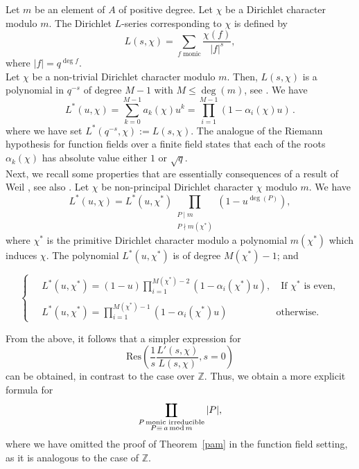 \documentclass[12pt]{amsart}
\DeclareMathOperator*\Rprod{%
\mathchoice
  {\ooalign{$\displaystyle\prod$\cr\hidewidth$\displaystyle\coprod$\hidewidth\cr}}%
  {\ooalign{$\textstyle\prod$\cr\hidewidth$\textstyle\coprod$\hidewidth\cr}}%
  {\ooalign{$\scriptstyle\prod$\cr\hidewidth$\scriptstyle\coprod$\hidewidth\cr}}%
  {\ooalign{$\scriptscriptstyle\prod$\cr\hidewidth$%
  \scriptscriptstyle\coprod$\hidewidth\cr}}}
\newcommand{\Z}{\mathbb{Z}}
\begin{document}
Let $m$ be an element of $A$ of positive degree.   Let $\chi$ be a Dirichlet character modulo $m$. The Dirichlet $L$-series corresponding to $\chi$ is defined by
\[
L(s, \chi) = \sum_{f \text{ monic}} \frac{\chi(f)}{|f|^s},
\]
where $|f|=q^{\deg f}$. \\


 Let $\chi$ be a non-trivial Dirichlet character modulo $m$. Then, $L(s, \chi)$ is a polynomial in $q^{-s}$ of degree $M-1$ with   $M\leq \deg(m)$, see \cite[Propositon 4.3]{Rosen}.    We have
\[
L^*(u, \chi) = \sum_{k=0}^{M-1} a_k(\chi) u^k = \prod_{i=1}^{M-1} (1 - \alpha_i(\chi) u) \,.
\]
where we have set $L^\ast(
q^{-s},\chi):=L(s,\chi)$. The analogue of the Riemann hypothesis for function fields over a finite field  states that each of the roots $\alpha_k(\chi)$ has absolute value either $1$ or $\sqrt{q}$.  \\


Next, we recall some  properties that are essentially consequences of a result of Weil 
\cite{Weil_1945}, see also \cite{Rosen}. Let $\chi$ be non-principal Dirichlet character $\chi$ modulo $m$. We have
 \[
    L^\ast(u, \chi) = L^\ast(u, \chi^*) \prod_{\substack{P \mid m \\ P \nmid m(\chi^*)}} (1 - u^{\deg(P)}),
    \]
    where $\chi^*$ is the primitive Dirichlet character modulo a polynomial $m(\chi^*)$ which induces $\chi$. The polynomial $L^\ast(u, \chi^*)$ is of  degree $M(\chi^*) - 1$; and 

\[
\begin{cases}
\quad L^\ast(u, \chi^*) = (1 - u) \prod_{i=1}^{M(\chi^*) - 2} (1 - \alpha_i(\chi^*) u),\quad \text{If } \chi^* \text{ is even},  \\
 \\
\quad L^\ast(u, \chi^*) = \prod_{i=1}^{M(\chi^*) - 1} (1 - \alpha_i(\chi^*) u)\quad\quad\quad\quad \quad \text{otherwise}.
\end{cases}
\]
\bigskip


From the above, it follows that a simpler expression for
\[
\mathrm{Res}\left( \frac{1}{s}  \frac{L'(s,\chi)}{L(s,\chi)}, s = 0 \right)
\]
can be obtained, in contrast to the case over $\mathbb{Z}$. Thus, we obtain a more explicit formula for
\[
\Rprod_{\substack{P \,\text{monic irreducible}  \\
P\equiv\, a \, \mathrm{mod}\, m }}|P|,
\]
where we have omitted the proof of Theorem~\ref{pam} in the function field setting, as it is analogous to the case of $\Z$.

















\end{document}

